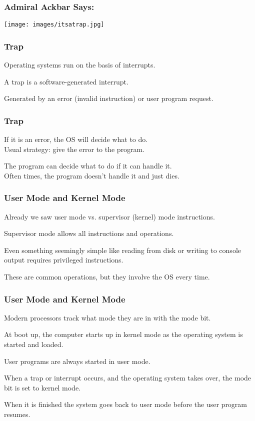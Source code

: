 \begin{frame}
	\frametitle{Admiral Ackbar Says:}

	\begin{center}
		\texttt{[image: images/itsatrap.jpg]}
	\end{center}

\end{frame}


\begin{frame}
	\frametitle{Trap}

	Operating systems run on the basis of interrupts.

	A \alert{trap} is a software-generated interrupt.

	Generated by an error (invalid instruction) or user program request.

\end{frame}

\begin{frame}
	\frametitle{Trap}

	If it is an error, the OS will decide what to do.\\
	\quad Usual strategy: give the error to the program.

	The program can decide what to do if it can handle it.\\
	\quad Often times, the program doesn't handle it and just dies.

\end{frame}

\begin{frame}
	\frametitle{User Mode and Kernel Mode}

	Already we saw user mode vs. supervisor (kernel) mode instructions.

	Supervisor mode allows all instructions and operations.

	Even something seemingly simple like reading from disk or writing to console output requires privileged instructions.

	These are common operations, but they involve the OS every time.


\end{frame}

\begin{frame}
	\frametitle{User Mode and Kernel Mode}

	Modern processors track what mode they are in with the mode bit.

	At boot up, the computer starts up in kernel mode as the operating system is started and loaded.

	User programs are always started in user mode.

	When a trap or interrupt occurs, and the operating system takes over, the mode bit is set to kernel mode.

	When it is finished the system goes back to user mode before the user program resumes.


\end{frame}


